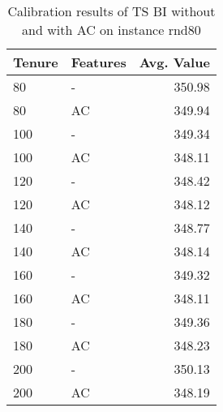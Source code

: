 	\begin{table}
		\centering
		\begin{tabular} {l l r}
			\toprule
			\textbf{Tenure} & \textbf{Features} & \textbf{Avg. Value} \\
			\midrule
			80 & -  & 350.98  \\
			80 & AC & 349.94 \\
			\midrule
			100 & - & 349.34 \\
			\rowcolor{LightGray}
			100 & AC & 348.11 \\
			\midrule
			\rowcolor{LightGray}
			120 & - & 348.42 \\
			120 & AC & 348.12 \\
			\midrule
			140 & - & 348.77 \\
			140 & AC & 348.14 \\
			\midrule
			160 & - & 349.32 \\
			\rowcolor{LightGray}
			160 & AC & 348.11 \\
			\midrule
			180 & - & 349.36 \\
			180 & AC & 348.23 \\
			\midrule
			200 & - & 350.13 \\
			200 & AC & 348.19  \\
			\bottomrule
		\end{tabular}
		\caption{\label{tab:TS-calibration80}Calibration results of TS BI without and with AC on instance rnd80}
	\end{table}
	



	